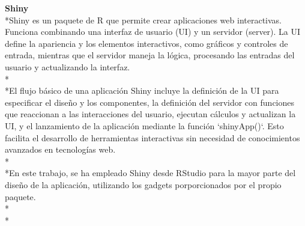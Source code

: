 \documentclass[a4paper,12pt,twoside]{memoir}
\begin{document}
\textbf{Shiny}\\*Shiny es un paquete de R que permite crear aplicaciones web interactivas. Funciona combinando una interfaz de usuario (UI) y un servidor (server). La UI define la apariencia y los elementos interactivos, como gráficos y controles de entrada, mientras que el servidor maneja la lógica, procesando las entradas del usuario y actualizando la interfaz. \\*\\*El flujo básico de una aplicación Shiny incluye la definición de la UI para especificar el diseño y los componentes, la definición del servidor con funciones que reaccionan a las interacciones del usuario, ejecutan cálculos y actualizan la UI, y el lanzamiento de la aplicación mediante la función `shinyApp()`. Esto facilita el desarrollo de herramientas interactivas sin necesidad de conocimientos avanzados en tecnologías web. \\*\\*En este trabajo, se ha empleado Shiny desde RStudio para la mayor parte del diseño de la aplicación, utilizando los gadgets porporcionados por el propio paquete.\cite{shinyweb}\\*\\*
\end{document}
